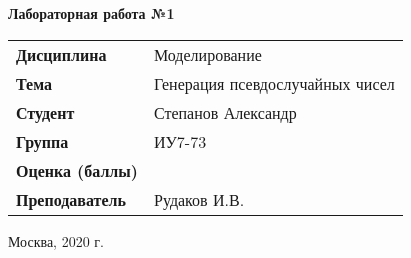 \begin{center}
    \textbf{Лабораторная работа №1} \\
    \vspace{0.5cm}
\end{center}

\vspace{4cm}

\begin{flushleft}
    \begin{tabular}{ll}
        \textbf{Дисциплина} & Моделирование \\
        \textbf{Тема} & Генерация псевдослучайных чисел \\
        \textbf{Студент} & Степанов Александр \\
        \textbf{Группа} & ИУ7-73 \\
        \textbf{Оценка (баллы)} & \\
        \textbf{Преподаватель} & Рудаков И.В. \\
    \end{tabular}
\end{flushleft}

\vspace{4cm}

\begin{center}
    Москва, 2020 г.
\end{center}
